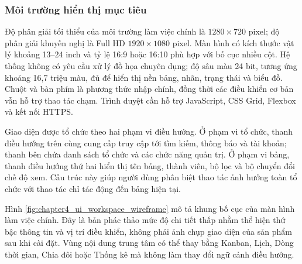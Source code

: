 \documentclass[../DoAn.tex]{subfiles}
\begin{document}
\subsubsection{Môi trường hiển thị mục tiêu}

Độ phân giải tối thiểu của môi trường làm việc chính là \(1280 \times 720\) pixel; độ phân giải khuyến nghị là Full HD \(1920 \times 1080\) pixel. Màn hình có kích thước vật lý khoảng 13--24 inch và tỷ lệ 16:9 hoặc 16:10 phù hợp với bố cục nhiều cột. Hệ thống không có yêu cầu xử lý đồ họa chuyên dụng; độ sâu màu 24 bit, tương ứng khoảng 16,7 triệu màu, đủ để hiển thị nền bảng, nhãn, trạng thái và biểu đồ. Chuột và bàn phím là phương thức nhập chính, đồng thời các điều khiển cơ bản vẫn hỗ trợ thao tác chạm. Trình duyệt cần hỗ trợ JavaScript, CSS Grid, Flexbox và kết nối HTTPS.

Giao diện được tổ chức theo hai phạm vi điều hướng. Ở phạm vi tổ chức, thanh điều hướng trên cùng cung cấp truy cập tới tìm kiếm, thông báo và tài khoản; thanh bên chứa danh sách tổ chức và các chức năng quản trị. Ở phạm vi bảng, thanh điều hướng thứ hai hiển thị tên bảng, thành viên, bộ lọc và bộ chuyển đổi chế độ xem. Cấu trúc này giúp người dùng phân biệt thao tác ảnh hưởng toàn tổ chức với thao tác chỉ tác động đến bảng hiện tại.

Hình \ref{fig:chapter4_ui_workspace_wireframe} mô tả khung bố cục của màn hình làm việc chính. Đây là bản phác thảo mức độ chi tiết thấp nhằm thể hiện thứ bậc thông tin và vị trí điều khiển, không phải ảnh chụp giao diện của sản phẩm sau khi cài đặt. Vùng nội dung trung tâm có thể thay bằng Kanban, Lịch, Dòng thời gian, Chia đôi hoặc Thống kê mà không làm thay đổi ngữ cảnh điều hướng.
\end{document}
